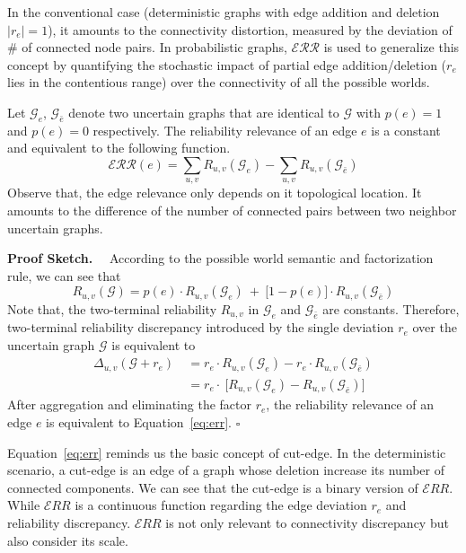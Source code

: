 In the conventional case (deterministic graphs with edge addition and deletion $|r_{e}|=1$), it amounts to the connectivity distortion, measured by the deviation of \# of connected node pairs.  
In probabilistic graphs, $\mathcal{ERR}$ is used to generalize this concept by quantifying the stochastic impact of partial edge addition/deletion ($r_{e}$ lies in the contentious range) over the connectivity of all the possible worlds.
\begin{observation}
  Let $\mathcal{G}_{e}$, $\mathcal{G}_{\bar{e}}$ 
  denote two uncertain graphs that are identical to $\mathcal{G}$ with $p(e)=1$ and $p(e)=0$ respectively. 
  The reliability relevance of an edge $e$ is a constant and equivalent to 
  the following function. 
  \begin{equation}
    \mathcal{ERR}(e) = \sum_{u,v} R_{u,v}(\mathcal{G}_{e}) \big- \sum_{u,v} R_{u,v}(\mathcal{G}_{\bar{e}})
    \label{eq:err}
  \end{equation}
  Observe that, the edge relevance only depends on it topological location. 
  It amounts to the difference of the number of connected pairs between two neighbor uncertain graphs. 
\end{observation}

\textbf{Proof Sketch.}~~
According to the possible world semantic and factorization rule, we can see that   
\begin{equation*}
  R_{u,v} (\mathcal{G}) = p(e) \cdot R_{u,v}(\mathcal{G}_{e}) ~+~ \big[ 1-p(e) \big] \cdot R_{u,v} (\mathcal{G}_{\bar{e}})
\end{equation*}
Note that, the two-terminal reliability $R_{u,v}$ in $\mathcal{G}_{e}$ and $\mathcal{G}_{\bar{e}}$ are constants. 
Therefore, two-terminal reliability discrepancy introduced by the single deviation $r_{e}$ over the uncertain graph $\mathcal{G}$ is equivalent to 
\begin{equation*}
  \begin{split}
    \Delta_{u,v} (\mathcal{G}+r_{e}) ~&= r_{e} \cdot R_{u,v}(\mathcal{G}_{e}) - r_{e} \cdot R_{u,v} (\mathcal{G}_{\bar{e}})\\
    &= r_{e} \cdot ~\big[  R_{u,v}(\mathcal{G}_{e}) - R_{u,v} (\mathcal{G}_{\bar{e}})  \big]
  \end{split}
\end{equation*}
After aggregation and eliminating the factor $r_{e}$, the reliability relevance of an edge $e$ is equivalent to Equation~\ref{eq:err}. $\square$

Equation~\ref{eq:err} reminds us the basic concept of cut-edge. 
In the deterministic scenario, a cut-edge is an edge of a graph whose deletion increase its number of connected components. 
We can see that the cut-edge is a binary version of $\mathcal{E}RR$.  
While $\mathcal{E}RR$ is a continuous function regarding the edge deviation $r_{e}$ and reliability discrepancy. 
$\mathcal{E}RR$ is not only relevant to connectivity discrepancy but also consider its scale.  


